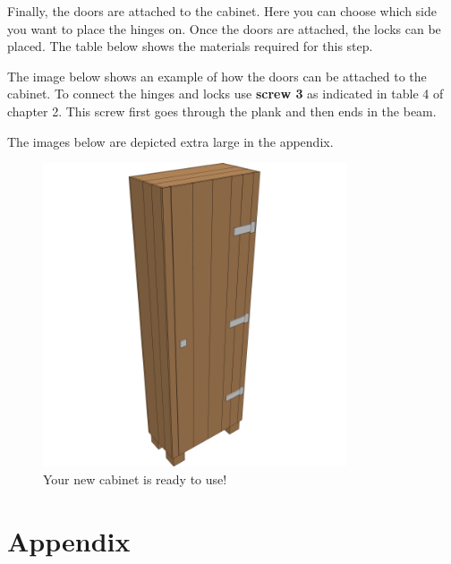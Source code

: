 \documentclass{article}
\begin{document}
Finally, the doors are attached to the cabinet. Here you can choose which side you want to place the hinges on. Once the doors are attached, the locks can be placed. The table below shows the materials required for this step.



The image below shows an example of how the doors can be attached to the cabinet. To connect the hinges and locks use \textbf{screw 3} as indicated in table 4 of chapter 2. This screw first goes through the plank and then ends in the beam.

The images below are depicted extra large in the appendix.

\begin{figure}[h!]
    \centering
    \includegraphics[width=0.8\textwidth]{scene 12 - compleet.png}
    \caption{Your new cabinet is ready to use!}
    \label{fig:stap 12}
\end{figure}

\clearpage
\newpage

\section{Appendix}
\end{document}
